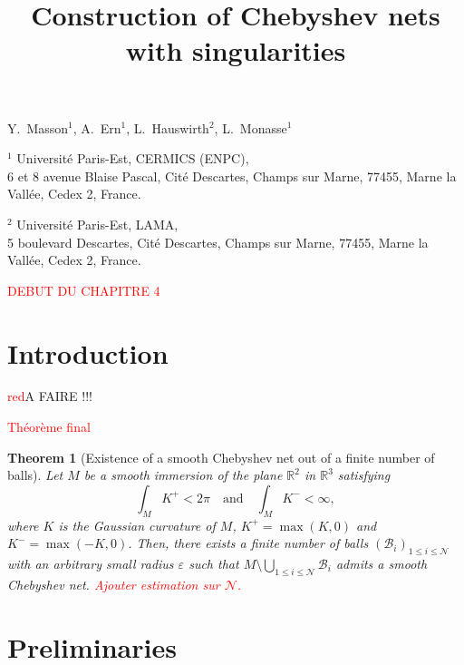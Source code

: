 \documentclass{article}
\newcommand{\R}{\mathbb{R}}
\newcommand{\surf}{M}
\newcommand{\modif}[1]{\textcolor{red}{#1}}
\newcommand{\N}{\mathcal{N}}
\newtheorem{theorem}{Theorem}
\theoremstyle{remark}
\theoremstyle{prpart}
\newcommand{\B}{\mathcal{B}}
\begin{document}
\title{Construction of Chebyshev nets with singularities}
\maketitle

\begin{center}{Y.~Masson$^{\textrm{1}}$,
    A.~Ern$^{\textrm{1}}$, L.~Hauswirth$^{\textrm{2}}$,
    L.~Monasse$^{\textrm{1}}$} \end{center}
\begin{center}
  $^{\textrm{1}}$ Universit\'e Paris-Est, CERMICS (ENPC), \\
  6 et 8 avenue Blaise Pascal, Cit\'e Descartes, Champs sur Marne, 77455, Marne la Vall\'ee, Cedex 2, France.
\end{center}
\begin{center}
  $^{\textrm{2}}$ Universit\'e Paris-Est, LAMA, \\
  5 boulevard Descartes, Cit\'e Descartes, Champs sur Marne, 77455, Marne la Vall\'ee, Cedex 2, France.
\end{center}



\modif{DEBUT DU CHAPITRE 4}
 

\section{Introduction}

\modif{red}{A FAIRE !!!}


\modif{Théorème final}
\begin{theorem}[Existence of a smooth Chebyshev net out of a finite
    number of balls]\label{thm:existence-cheb-net}
  Let $\surf$ be a smooth immersion of the plane $\R^2$ in $\R^3$ satisfying
\begin{equation} \label{eq:cond-thm}
  \int_{\surf}K^+<2\pi\quad\text{and}\quad\int_{\surf}K^-<\infty,
\end{equation}
where $K$ is the Gaussian curvature of $\surf$, $K^+=\max(K,0)$ and $K^-=\max(-K,0)$. %
Then, there exists a finite number of balls $(\B_i)_{1\leq i\leq \N}$
with an arbitrary small radius $\varepsilon$ such that
$M\setminus\bigcup_{1\leq i\leq \N}\B_i$ admits a smooth Chebyshev
net. \modif{Ajouter estimation sur $\N$.}
\end{theorem}

\section{Preliminaries}
\end{document}
